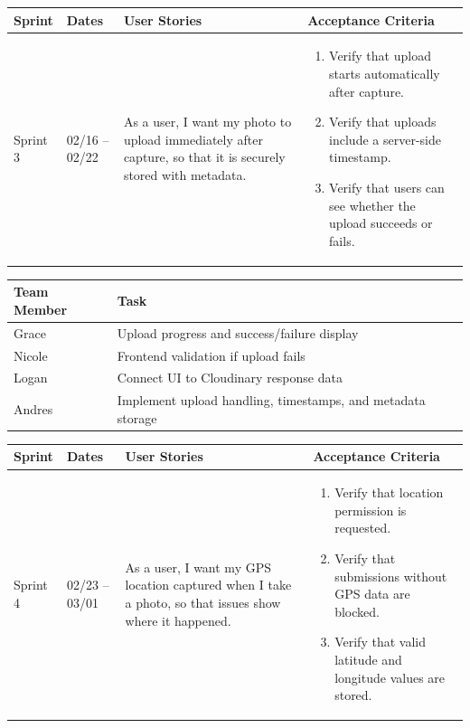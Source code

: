 \documentclass[12pt]{article}
\begin{document}
\vspace{2em}


\vspace{0.5em}

\noindent
\begin{tabular}{|L{1.2cm}|L{1.8cm}|L{5.2cm}|L{6.3cm}|}
\hline
\textbf{Sprint} & \textbf{Dates} & \textbf{User Stories} & \textbf{Acceptance Criteria} \\
\hline
Sprint 3 & 02/16 -- 02/22 &
As a user, I want my photo to upload immediately after capture, so that it is securely stored with metadata. &
\begin{enumerate}
    \item Verify that upload starts automatically after capture.
    \item Verify that uploads include a server-side timestamp.
    \item Verify that users can see whether the upload succeeds or fails.
\end{enumerate} \\
\hline
\end{tabular}

\vspace{0.5em}

\noindent
\begin{tabular}{|L{2.5cm}|L{12.5cm}|}
\hline
\textbf{Team Member} & \textbf{Task} \\
\hline
Grace & Upload progress and success/failure display \\
\hline
Nicole & Frontend validation if upload fails \\
\hline
Logan & Connect UI to Cloudinary response data \\
\hline
Andres & Implement upload handling, timestamps, and metadata storage \\
\hline
\end{tabular}

\vspace{2em}


\vspace{0.5em}

\noindent
\begin{tabular}{|L{1.2cm}|L{1.8cm}|L{5.2cm}|L{6.3cm}|}
\hline
\textbf{Sprint} & \textbf{Dates} & \textbf{User Stories} & \textbf{Acceptance Criteria} \\
\hline
Sprint 4 & 02/23 -- 03/01 &
As a user, I want my GPS location captured when I take a photo, so that issues show where it happened. &
\begin{enumerate}
    \item Verify that location permission is requested.
    \item Verify that submissions without GPS data are blocked.
    \item Verify that valid latitude and longitude values are stored.
\end{enumerate} \\
\hline
\end{tabular}
\end{document}
